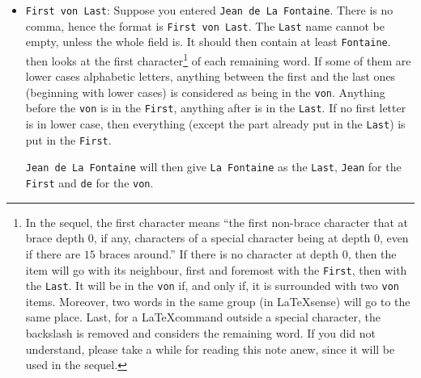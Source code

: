\begin{itemize}
\item \verb+First von Last+: Suppose you entered
\verb+Jean de La Fontaine+. There is no comma, hence the format is 
\verb+First von Last+. The \verb+Last+ name cannot be empty, unless
the whole field is. It should then contain at least \verb+Fontaine+. 
\bt then looks at the first character\footnote{In the sequel, the
  first character means ``the first non-brace character that at brace depth
  $0$, if 
  any, characters of a special character being
  at depth $0$, even if there are $15$ braces around.'' If there is 
  no 
  character at depth $0$, then the item will go with its neighbour,
  first and foremost with the \texttt{First}, then with the \texttt{Last}. It 
  will be in the \texttt{von} if, and only if, it is surrounded with
  two \texttt{von} items. Moreover, two words in the same group
  (in \LaTeX sense) will go to the same place. Last, for a
  \LaTeX command outside a special character, the backslash is removed
  and \bt considers the remaining word. If you did not understand,
  please take a while for reading this note anew, since it will be
  used 
  in the sequel.} of each remaining word. If some 
of them are lower cases alphabetic letters, 
anything between the first and the last ones
(beginning with lower cases) is considered as being in the
\verb+von+. Anything before the 
\verb+von+ is in the \verb+First+, anything after is in the
\verb+Last+. If no first letter is in lower case, then everything
(except the part already put in the \verb+Last+) is put in the
\verb+First+. 

\verb+Jean de La Fontaine+ will then give \verb+La Fontaine+ as the
\verb+Last+, \verb+Jean+ for the \verb+First+ and \verb+de+ for the
\verb+von+. 


\end{itemize}
